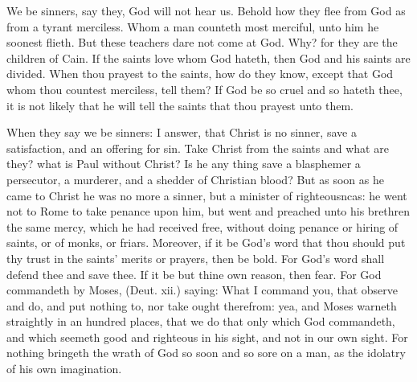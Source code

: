 We be sinners, say they, God will not hear us. Behold 
how they flee from God as from a tyrant merciless. Whom 
a man counteth most merciful, unto him he soonest flieth. 
But these teachers dare not come at God. Why? for 
they are the children of Cain. If the saints love whom 
God hateth, then God and his saints are divided. When 
thou prayest to the saints, how do they know, except that
God whom thou countest merciless, tell them? If God be
so cruel and so hateth thee, it is not likely that he will tell
the saints that thou prayest unto them. 

When they say we be sinners: I answer, that Christ is 
no sinner, save a satisfaction, and an offering for sin. 
Take Christ from the saints and what are they? what is 
Paul without Christ? Is he any thing save a blasphemer 
a persecutor, a murderer, and a shedder of Christian blood? 
But as soon as he came to Christ he was no more a sinner, 
but a minister of righteousncas: he went not to Rome to 
take penance upon him, but went and preached unto his 
brethren the same mercy, which he had received free, 
without doing penance or hiring of saints, or of monks, or 
friars. Moreover, if it be God's word that thou should 
put thy trust in the saints' merits or prayers, then be bold. 
For God's word shall defend thee and save thee. If it be 
but thine own reason, then fear. For God commandeth 
by Moses, (Deut. xii.) saying: What I command you, 
that observe and do, and put nothing to, nor take ought 
therefrom: yea, and Moses warneth straightly in an hundred 
places, that we do that only which God commandeth, and 
which seemeth good and righteous in his sight, and not in
our own sight. For nothing bringeth the wrath of God 
so soon and so sore on a man, as the idolatry of his own 
imagination. 

